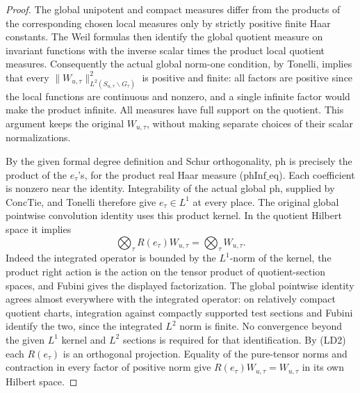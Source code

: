 \begin{proof}
The global unipotent and compact measures differ from
the products of the corresponding chosen local measures
only by strictly positive finite Haar constants.
The Weil formulas then identify the global quotient
measure on invariant functions with the inverse scalar
times the product local quotient measures. Consequently
the actual global norm-one condition, by Tonelli, implies
that every \(\|W_{u,\tau}\|_{L^2(S_{u,\tau}\backslash G_\tau)}^2\)
is positive and finite: all factors are positive since
the local functions are continuous and nonzero, and a
single infinite factor would make the product infinite.
All measures have full support on the quotient.
This argument keeps the original \(W_{u,\tau}\), without
making separate choices of their scalar normalizations.

By the given formal degree definition and Schur
orthogonality, \(\mathrm{ph}\) is precisely the product of
the \(e_\tau\)'s, for the product real Haar measure
(\(\mathrm{phInf\_eq}\)). Each coefficient is nonzero
near the identity. Integrability of the actual global
\(\mathrm{ph}\), supplied by \(\mathrm{ConcTie}\), and
Tonelli therefore give \(e_\tau\in L^1\) at every place.
The original global pointwise convolution identity uses
this product kernel. In the quotient Hilbert space it
implies
\[
     \bigotimes_\tau R(e_\tau)W_{u,\tau}
                =\bigotimes_\tau W_{u,\tau}.
\]
Indeed the integrated operator is bounded by the
\(L^1\)-norm of the kernel, the product right action is
the action on the tensor product of quotient-section
spaces, and Fubini gives the displayed factorization.
The global pointwise identity agrees almost everywhere
with the integrated operator: on relatively compact
quotient charts, integration against compactly supported
test sections and Fubini identify the two, since the
integrated \(L^2\) norm is finite. No convergence beyond
the given \(L^1\) kernel and \(L^2\) sections is required
for that identification. By (LD2) each \(R(e_\tau)\)
is an orthogonal projection. Equality of the pure-tensor
norms and contraction in every factor of positive norm
give \(R(e_\tau)W_{u,\tau}=W_{u,\tau}\) in its own
Hilbert space.


\end{proof}
